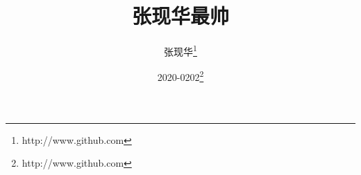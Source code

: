 \documentclass{zxhClass}
\begin{document}
	\title{张现华最帅}
	\author{张现华\thanks{http://www.github.com}}
	\date{2020-0202\thanks{http://www.github.com}}	
	\maketitle
	\newpage

%
	\tableofcontents


%

%

%
	
%
%	
%	
\end{document}
